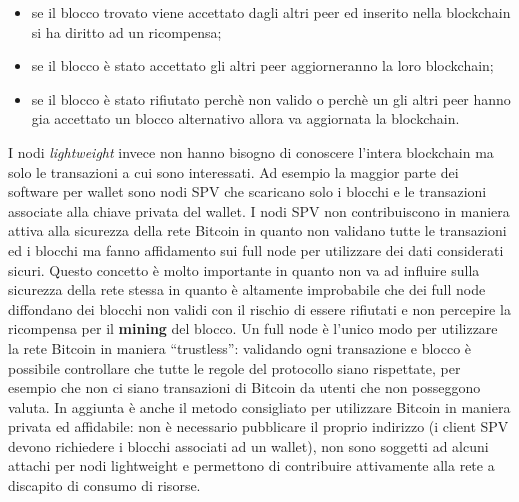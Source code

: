 \begin{enumerate}[1.]
\begin{itemize}
\begin{itemize}
        \item se il blocco trovato viene accettato dagli altri peer ed inserito nella blockchain si ha diritto ad un ricompensa;
        \item se il blocco è stato accettato gli altri peer aggiorneranno la loro blockchain;
        \item se il blocco è stato rifiutato perchè non valido o perchè un gli altri peer hanno gia accettato un blocco alternativo allora va aggiornata la blockchain.
    \end{itemize}
\end{itemize}
I nodi \textit{lightweight} invece non hanno bisogno di conoscere l'intera blockchain ma solo le transazioni a cui sono interessati. Ad esempio la maggior parte dei software per wallet sono nodi SPV che scaricano solo i blocchi e le transazioni associate alla chiave privata del wallet.\newline
I nodi SPV non contribuiscono in maniera attiva alla sicurezza della rete Bitcoin in quanto non validano tutte le transazioni ed i blocchi ma fanno affidamento sui full node per utilizzare dei dati considerati sicuri. Questo concetto è molto importante in quanto non va ad influire sulla sicurezza della rete stessa in quanto è altamente improbabile che dei full node diffondano dei blocchi non validi con il rischio di essere rifiutati e non percepire la ricompensa per il \textbf{mining} del blocco.\newline
Un full node è l'unico modo per utilizzare la rete Bitcoin in maniera ``trustless'': validando ogni transazione e blocco è possibile controllare che tutte le regole del protocollo siano rispettate, per esempio che non ci siano transazioni di Bitcoin da utenti che non posseggono valuta. In aggiunta è anche il metodo consigliato per utilizzare Bitcoin in maniera privata ed affidabile: non è necessario pubblicare il proprio indirizzo (i client SPV devono richiedere i blocchi associati ad un wallet), non sono soggetti ad alcuni attachi per nodi lightweight e permettono di contribuire attivamente alla rete a discapito di consumo di risorse.


\end{enumerate}
